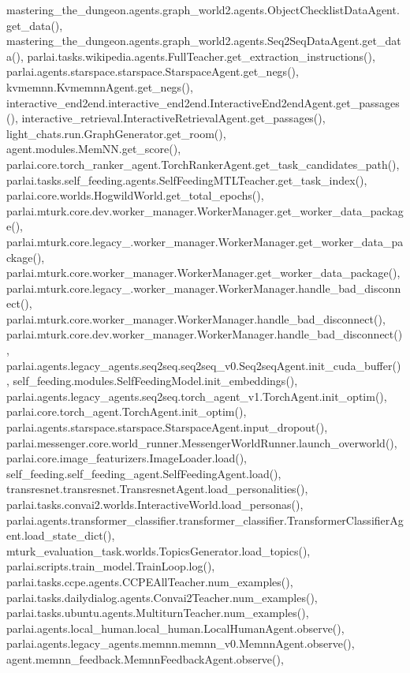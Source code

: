 mastering\+\_\+the\+\_\+dungeon.\+agents.\+graph\+\_\+world2.\+agents.\+Object\+Checklist\+Data\+Agent.\+get\+\_\+data(), mastering\+\_\+the\+\_\+dungeon.\+agents.\+graph\+\_\+world2.\+agents.\+Seq2\+Seq\+Data\+Agent.\+get\+\_\+data(), parlai.\+tasks.\+wikipedia.\+agents.\+Full\+Teacher.\+get\+\_\+extraction\+\_\+instructions(), parlai.\+agents.\+starspace.\+starspace.\+Starspace\+Agent.\+get\+\_\+negs(), kvmemnn.\+Kvmemnn\+Agent.\+get\+\_\+negs(), interactive\+\_\+end2end.\+interactive\+\_\+end2end.\+Interactive\+End2end\+Agent.\+get\+\_\+passages(), interactive\+\_\+retrieval.\+Interactive\+Retrieval\+Agent.\+get\+\_\+passages(), light\+\_\+chats.\+run.\+Graph\+Generator.\+get\+\_\+room(), agent.\+modules.\+Mem\+N\+N.\+get\+\_\+score(), parlai.\+core.\+torch\+\_\+ranker\+\_\+agent.\+Torch\+Ranker\+Agent.\+get\+\_\+task\+\_\+candidates\+\_\+path(), parlai.\+tasks.\+self\+\_\+feeding.\+agents.\+Self\+Feeding\+M\+T\+L\+Teacher.\+get\+\_\+task\+\_\+index(), parlai.\+core.\+worlds.\+Hogwild\+World.\+get\+\_\+total\+\_\+epochs(), parlai.\+mturk.\+core.\+dev.\+worker\+\_\+manager.\+Worker\+Manager.\+get\+\_\+worker\+\_\+data\+\_\+package(), parlai.\+mturk.\+core.\+legacy\+\_.\+worker\+\_\+manager.\+Worker\+Manager.\+get\+\_\+worker\+\_\+data\+\_\+package(), parlai.\+mturk.\+core.\+worker\+\_\+manager.\+Worker\+Manager.\+get\+\_\+worker\+\_\+data\+\_\+package(), parlai.\+mturk.\+core.\+legacy\+\_.\+worker\+\_\+manager.\+Worker\+Manager.\+handle\+\_\+bad\+\_\+disconnect(), parlai.\+mturk.\+core.\+worker\+\_\+manager.\+Worker\+Manager.\+handle\+\_\+bad\+\_\+disconnect(), parlai.\+mturk.\+core.\+dev.\+worker\+\_\+manager.\+Worker\+Manager.\+handle\+\_\+bad\+\_\+disconnect(), parlai.\+agents.\+legacy\+\_\+agents.\+seq2seq.\+seq2seq\+\_\+v0.\+Seq2seq\+Agent.\+init\+\_\+cuda\+\_\+buffer(), self\+\_\+feeding.\+modules.\+Self\+Feeding\+Model.\+init\+\_\+embeddings(), parlai.\+agents.\+legacy\+\_\+agents.\+seq2seq.\+torch\+\_\+agent\+\_\+v1.\+Torch\+Agent.\+init\+\_\+optim(), parlai.\+core.\+torch\+\_\+agent.\+Torch\+Agent.\+init\+\_\+optim(), parlai.\+agents.\+starspace.\+starspace.\+Starspace\+Agent.\+input\+\_\+dropout(), parlai.\+messenger.\+core.\+world\+\_\+runner.\+Messenger\+World\+Runner.\+launch\+\_\+overworld(), parlai.\+core.\+image\+\_\+featurizers.\+Image\+Loader.\+load(), self\+\_\+feeding.\+self\+\_\+feeding\+\_\+agent.\+Self\+Feeding\+Agent.\+load(), transresnet.\+transresnet.\+Transresnet\+Agent.\+load\+\_\+personalities(), parlai.\+tasks.\+convai2.\+worlds.\+Interactive\+World.\+load\+\_\+personas(), parlai.\+agents.\+transformer\+\_\+classifier.\+transformer\+\_\+classifier.\+Transformer\+Classifier\+Agent.\+load\+\_\+state\+\_\+dict(), mturk\+\_\+evaluation\+\_\+task.\+worlds.\+Topics\+Generator.\+load\+\_\+topics(), parlai.\+scripts.\+train\+\_\+model.\+Train\+Loop.\+log(), parlai.\+tasks.\+ccpe.\+agents.\+C\+C\+P\+E\+All\+Teacher.\+num\+\_\+examples(), parlai.\+tasks.\+dailydialog.\+agents.\+Convai2\+Teacher.\+num\+\_\+examples(), parlai.\+tasks.\+ubuntu.\+agents.\+Multiturn\+Teacher.\+num\+\_\+examples(), parlai.\+agents.\+local\+\_\+human.\+local\+\_\+human.\+Local\+Human\+Agent.\+observe(), parlai.\+agents.\+legacy\+\_\+agents.\+memnn.\+memnn\+\_\+v0.\+Memnn\+Agent.\+observe(), agent.\+memnn\+\_\+feedback.\+Memnn\+Feedback\+Agent.\+observe(), 